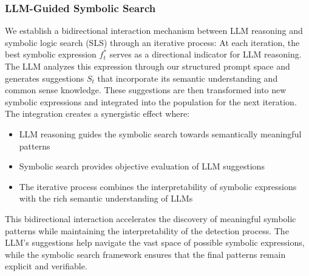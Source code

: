 \subsubsection{LLM-Guided Symbolic Search}
We establish a bidirectional interaction mechanism between LLM reasoning and symbolic logic search (SLS) through an iterative process:
At each iteration, the best symbolic expression $f_t^*$ serves as a directional indicator for LLM reasoning. The LLM analyzes this expression through our structured prompt space and generates suggestions $S_t$ that incorporate its semantic understanding and common sense knowledge. These suggestions are then transformed into new symbolic expressions and integrated into the population for the next iteration.
The integration creates a synergistic effect where:
\begin{itemize}
    \item LLM reasoning guides the symbolic search towards semantically meaningful patterns
    \item Symbolic search provides objective evaluation of LLM suggestions
    \item The iterative process combines the interpretability of symbolic expressions with the rich semantic understanding of LLMs
\end{itemize} 
This bidirectional interaction accelerates the discovery of meaningful symbolic patterns while maintaining the interpretability of the detection process. The LLM's suggestions help navigate the vast space of possible symbolic expressions, while the symbolic search framework ensures that the final patterns remain explicit and verifiable. \par
